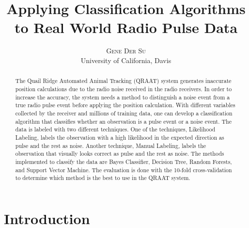 \documentclass[twoside]{article}
\title{\vspace{-15mm}\fontsize{24pt}{10pt}\selectfont\textbf{Applying Classification Algorithms to Real World Radio Pulse Data}} %
\author{
\large
\textsc{Gene Der Su}\\
\normalsize University of California, Davis \\ %
\vspace{-5mm}
}
\date{}
\begin{document}
\maketitle %

\thispagestyle{fancy} %


\begin{abstract}

\noindent The Quail Ridge Automated Animal Tracking (QRAAT) system generates inaccurate position calculations due to the radio noise received in the radio receivers. In order to increase the accuracy, the system needs a method to distinguish a noise event from a true radio pulse event before applying the position calculation. With different variables collected by the receiver and millions of training data, one can develop a classification algorithm that classifies whether an observation is a pulse event or a noise event. The data is labeled with two different techniques. One of the techniques, Likelihood Labeling, labels the observation with a high likelihood in the expected direction as pulse and the rest as noise. Another technique, Manual Labeling, labels the observation that visually looks correct as pulse and the rest as noise. The methods implemented to classify the data are Bayes Classifier, Decision Tree, Random Forests, and Support Vector Machine. The evaluation is done with the 10-fold cross-validation to determine which method is the best to use in the QRAAT system. 

\end{abstract}



\section{Introduction}

\end{document}
